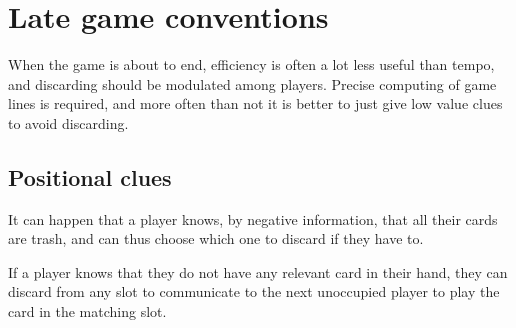 \section{Late game conventions}
\label{sec:late-game}

When the game is about to end, efficiency is often a lot less useful than tempo, and discarding should be modulated among players. Precise computing of game lines is required, and more often than not it is better to just give low value clues to avoid discarding. 

\subsection{Positional clues}

It can happen that a player knows, by negative information, that all their cards are trash, and can thus choose which one to discard if they have to.

\begin{convention}
	If a player knows that they do not have any relevant card in their hand, they can discard from any slot to communicate to the next unoccupied player to play the card in the matching slot.
\end{convention}


